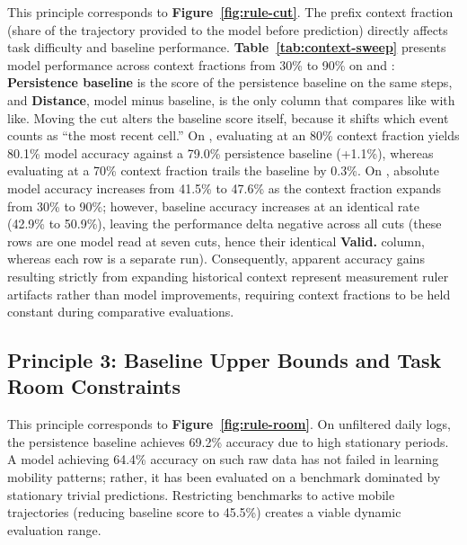 This principle corresponds to \textbf{Figure~\ref{fig:rule-cut}}. The prefix context fraction (share of the trajectory provided to the model before prediction) directly affects task difficulty and baseline performance. \textbf{Table~\ref{tab:context-sweep}} presents model performance across context fractions from 30\% to 90\% on \Dfilt{} and \Dmob{}: \textbf{Persistence baseline} is the score of the persistence baseline on the same steps, and \textbf{Distance}, model minus baseline, is the only column that compares like with like. Moving the cut alters the baseline score itself, because it shifts which event counts as ``the most recent cell.'' On \Dfilt{}, evaluating at an 80\% context fraction yields 80.1\% model accuracy against a 79.0\% persistence baseline (+1.1\%), whereas evaluating at a 70\% context fraction trails the baseline by 0.3\%. On \Dmob{}, absolute model accuracy increases from 41.5\% to 47.6\% as the context fraction expands from 30\% to 90\%; however, baseline accuracy increases at an identical rate (42.9\% to 50.9\%), leaving the performance delta negative across all cuts (these \Dmob{} rows are one model read at seven cuts, hence their identical \textbf{Valid.} column, whereas each \Dfilt{} row is a separate run). Consequently, apparent accuracy gains resulting strictly from expanding historical context represent measurement ruler artifacts rather than model improvements, requiring context fractions to be held constant during comparative evaluations.





\FloatBarrier

\subsection{Principle 3: Baseline Upper Bounds and Task Room Constraints}

This principle corresponds to \textbf{Figure~\ref{fig:rule-room}}. On unfiltered daily logs, the persistence baseline achieves 69.2\% accuracy due to high stationary periods. A model achieving 64.4\% accuracy on such raw data has not failed in learning mobility patterns; rather, it has been evaluated on a benchmark dominated by stationary trivial predictions. Restricting benchmarks to active mobile trajectories (reducing baseline score to 45.5\%) creates a viable dynamic evaluation range.



